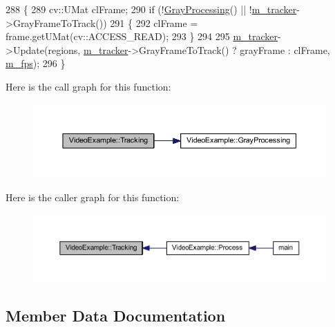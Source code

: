 \begin{DoxyCode}
288 \{
289     cv::UMat clFrame;
290     \textcolor{keywordflow}{if} (!\mbox{\hyperlink{class_video_example_af8ea44f17711129d2b954d1f01fee1f0}{GrayProcessing}}() || !\mbox{\hyperlink{class_video_example_a7c58cd8c883981b2e645d1a3d8edf76a}{m\_tracker}}->GrayFrameToTrack())
291     \{
292         clFrame = frame.getUMat(cv::ACCESS\_READ);
293     \}
294 
295     \mbox{\hyperlink{class_video_example_a7c58cd8c883981b2e645d1a3d8edf76a}{m\_tracker}}->Update(regions, \mbox{\hyperlink{class_video_example_a7c58cd8c883981b2e645d1a3d8edf76a}{m\_tracker}}->GrayFrameToTrack() ? grayFrame : clFrame, 
      \mbox{\hyperlink{class_video_example_ae8110012f8d57f39d6355377cf20fb27}{m\_fps}});
296 \}
\end{DoxyCode}
Here is the call graph for this function\+:\nopagebreak
\begin{figure}[H]
\begin{center}
\leavevmode
\includegraphics[width=350pt]{class_video_example_af412482dcaad532d958dc31b362ee1c2_cgraph}
\end{center}
\end{figure}
Here is the caller graph for this function\+:\nopagebreak
\begin{figure}[H]
\begin{center}
\leavevmode
\includegraphics[width=350pt]{class_video_example_af412482dcaad532d958dc31b362ee1c2_icgraph}
\end{center}
\end{figure}


\subsection{Member Data Documentation}
\mbox{\label{class_video_example_aea3c9dd66a3464fab8c61a838aff0ccf}} 
